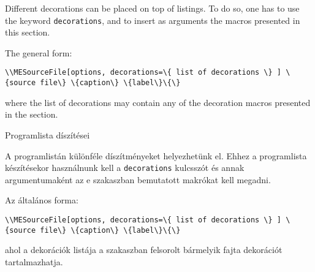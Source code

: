 {
Different decorations can be placed on top of listings.
To do so, one has to use the keyword  \lstinline|decorations|,
and to insert as arguments the macros presented in this section.

The general form:
\par\noindent\lstinline|\\MESourceFile[options,
decorations=\{
list of decorations
\}
] \{source file\} \{caption\} \{label\}\{\}|
\par\noindent where the list of decorations may contain any of the 
decoration macros presented in the section.
}
{Programlista díszítései}
{
A programlistán különféle díszítményeket helyezhetünk el.
Ehhez a programlista készítésekor használnunk kell a \lstinline|decorations| kulcsszót
és annak argumentumaként az e szakaszban bemutatott makrókat kell megadni.

Az általános forma:
\par\noindent\lstinline|\\MESourceFile[options,
decorations=\{
list of decorations
\}
] \{source file\} \{caption\} \{label\}\{\}|
\par\noindent ahol a dekorációk listája a szakaszban felsorolt 
bármelyik fajta dekorációt tartalmazhatja.
}


